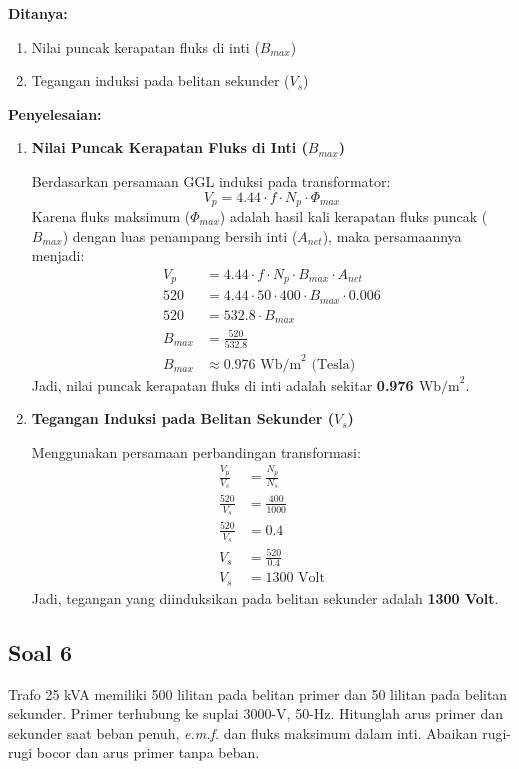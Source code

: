 \documentclass[12pt, a4paper]{article}
\begin{document}
\textbf{Ditanya:}
\begin{enumerate}[label=\alph*.]
    \item Nilai puncak kerapatan fluks di inti ($B_{max}$)
    \item Tegangan induksi pada belitan sekunder ($V_s$)
\end{enumerate}

\textbf{Penyelesaian:}

\begin{enumerate}[label=\alph*.]
    \item \textbf{Nilai Puncak Kerapatan Fluks di Inti ($B_{max}$)}

    Berdasarkan persamaan GGL induksi pada transformator:
    \[
        V_p = 4.44 \cdot f \cdot N_p \cdot \Phi_{max}
    \]
    Karena fluks maksimum ($\Phi_{max}$) adalah hasil kali kerapatan fluks puncak ($B_{max}$) dengan luas penampang bersih inti ($A_{net}$), maka persamaannya menjadi:
    \begin{align*}
        V_p &= 4.44 \cdot f \cdot N_p \cdot B_{max} \cdot A_{net} \\
        520 &= 4.44 \cdot 50 \cdot 400 \cdot B_{max} \cdot 0.006 \\
        520 &= 532.8 \cdot B_{max} \\
        B_{max} &= \frac{520}{532.8} \\
        B_{max} &\approx 0.976 \text{ Wb/m}^2 \text{ (Tesla)}
    \end{align*}
    Jadi, nilai puncak kerapatan fluks di inti adalah sekitar \textbf{0.976 $\text{Wb/m}^2$}.

    \item \textbf{Tegangan Induksi pada Belitan Sekunder ($V_s$)}

    Menggunakan persamaan perbandingan transformasi:
    \begin{align*}
        \frac{V_p}{V_s} &= \frac{N_p}{N_s} \\
        \frac{520}{V_s} &= \frac{400}{1000} \\
        \frac{520}{V_s} &= 0.4 \\
        V_s &= \frac{520}{0.4} \\
        V_s &= 1300 \text{ Volt}
    \end{align*}
    Jadi, tegangan yang diinduksikan pada belitan sekunder adalah \textbf{1300 Volt}.
\end{enumerate}

\subsection*{Soal 6}
Trafo 25 kVA memiliki 500 lilitan pada belitan primer dan 50 lilitan pada belitan sekunder. Primer terhubung ke suplai 3000-V, 50-Hz. Hitunglah arus primer dan sekunder saat beban penuh, \textit{e.m.f.} dan fluks maksimum dalam inti. Abaikan rugi-rugi bocor dan arus primer tanpa beban.\\
\end{document}
